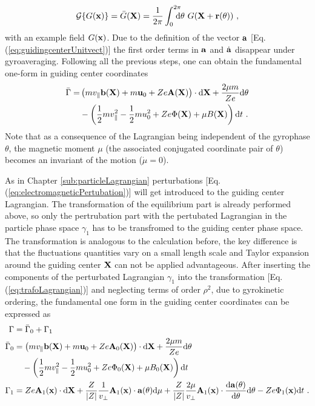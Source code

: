\begin{gather}
    \mathcal{G} \{G(\boldsymbol{\mathbf{x}})\} = \bar{G}(\boldsymbol{\mathbf{X}}) = \frac{1}{2\pi} \int_{0}^{2\pi} \!\!\!\!\! \mathrm{d}\theta ~ G(\boldsymbol{\mathbf{X}} + \boldsymbol{\mathbf{r}}(\theta))~,
    \label{eq:gyroOperator}
\end{gather}
with an example field $G(\boldsymbol{\mathbf{x}})$. Due to the definition of the vector $\boldsymbol{\mathbf{a}}$ [Eq. (\ref{eq:guidingcenterUnitvect})] the first order terms in $\boldsymbol{\mathbf{a}}$ and $\dot{\boldsymbol{\mathbf{a}}}$ disappear under gyroaveraging. Following all the previous steps, one can obtain the fundamental one-form in guiding center coordinates
\begin{gather}
    \begin{aligned}
        \bar{\Gamma} =  &\left(m v_\parallel \boldsymbol{\mathbf{b}}(\boldsymbol{\mathbf{X}}) + m\boldsymbol{\mathbf{u}}_0 + Ze\boldsymbol{\mathbf{A}}(\boldsymbol{\mathbf{X}})\right) \cdot \mathrm{d}\boldsymbol{\mathbf{X}} + \frac{2\mu m}{Ze} \mathrm{d}\theta \\
                                  &- \left(\frac{1}{2}mv_\parallel^2 - \frac{1}{2}mu_0^2 + Ze\Phi(\boldsymbol{\mathbf{X}}) + \mu B(\boldsymbol{\mathbf{X}}) \right) \mathrm{d}t~.
    \end{aligned}
    \label{eq:guidingcenterLagrangian}
\end{gather}
Note that as a consequence of the Lagrangian being independent of the gyrophase $\theta$, the magnetic moment $\mu$ (the associated conjugated coordinate pair of $\theta$) becomes an invariant of the motion ($\dot{\mu} = 0$). \bigskip

As in Chapter \ref{sub:particleLagrangian} perturbations [Eq. (\ref{eq:electromagneticPertubation})] will get introduced to the guiding center Lagrangian. The transformation of the equilibrium part is already performed above, so only the pertrubation part with the pertubated Lagrangian in the particle phase space $\gamma_1$ has to be transfromed to the guiding center phase space. The transformation is analogous to the calculation before, the key difference is that the fluctuations quantities vary on a small length scale and Taylor expansion around the guiding center $\boldsymbol{\mathbf{X}}$ can not be applied advantageous. After inserting the components of the perturbated Lagrangian $\gamma_1$ into the transformation [Eq. (\ref{eq:trafoLagrangian})] and neglecting terms of order $\rho^2$, due to gyrokinetic ordering, the fundamental one form in the guiding center coordinates can be expressed as
\begin{gather}
    \begin{aligned}
        \Gamma        &= \bar{\Gamma}_0 + \Gamma_1 \\
        \bar{\Gamma}_0 &= \left(m v_\parallel \boldsymbol{\mathbf{b}}(\boldsymbol{\mathbf{X}}) + m\boldsymbol{\mathbf{u}}_0 + Ze\boldsymbol{\mathbf{A}}_0(\boldsymbol{\mathbf{X}})\right) \cdot \mathrm{d}\boldsymbol{\mathbf{X}} + \frac{2\mu m}{Ze} \mathrm{d}\theta \\
                      &\quad - \left(\frac{1}{2}mv_\parallel^2 - \frac{1}{2}mu_0^2 + Ze\Phi_0(\boldsymbol{\mathbf{X}}) + \mu B_0(\boldsymbol{\mathbf{X}}) \right) \mathrm{d}t \\
        \Gamma_1      &= Ze\boldsymbol{\mathbf{A}}_{1}(\boldsymbol{\mathbf{x}}) \cdot \mathrm{d}\boldsymbol{\mathbf{X}} + \frac{Z}{\abs{Z}} \frac{1}{v_\perp} \boldsymbol{\mathbf{A}}_1(\boldsymbol{\mathbf{x}}) \cdot \boldsymbol{\mathbf{a}}(\theta) \mathrm{d}\mu + \frac{Z}{\abs{Z}} \frac{2\mu}{v_\perp} \boldsymbol{\mathbf{A}}_1(\boldsymbol{\mathbf{x}}) \cdot \frac{\mathrm{d}\boldsymbol{\mathbf{a}}(\theta)}{\mathrm{d}\theta} \mathrm{d}\theta - Ze \Phi_1(\boldsymbol{\mathbf{x}}) \mathrm{d}t~. 
    \end{aligned}
\end{gather}

